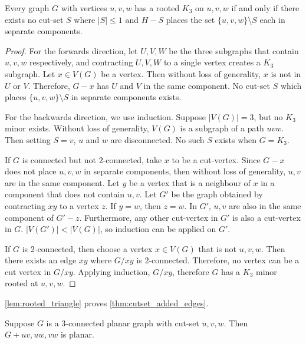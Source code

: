 \begin{lemma}\label{lem:rooted_triangle}
	Every graph $G$ with vertices $u, v, w$ has a rooted $K_3$ on $u, v, w$ if and only if there exists no cut-set $S$ where $|S| \leq 1$ and $H - S$ places the set $\{u,v,w\} \setminus S$ each in separate components. 
\end{lemma}
\begin{proof}
	For the forwards direction, let $U,V,W$ be the three subgraphs that contain $u, v, w$ respectively, and contracting $U, V, W$ to a single vertex creates a $K_3$ subgraph. Let $x \in V(G)$ be a vertex. Then without loss of generality, $x$ is not in $U$ or $V$. Therefore, $G - x$ has $U$ and $V$ in the same component. No cut-set $S$ which places $\{u,v,w\} \setminus S$ in separate components exists. 

	For the backwards direction, we use induction. Suppose $|V(G)| = 3$, but no $K_3$ minor exists. Without loss of generality, $V(G)$ is a subgraph of a path $uvw$. Then setting $S = v$, $u$ and $w$ are disconnected. No such $S$ exists when $G = K_3$. 

	If $G$ is connected but not $2$-connected, take $x$ to be a cut-vertex. Since $G - x$ does not place $u,v,w$ in separate components, then without loss of generality, $u,v$ are in the same component. Let $y$ be a vertex that is a neighbour of $x$ in a component that does not contain $u,v$. Let $G'$ be the graph obtained by contracting $xy$ to a vertex $z$. If $y = w$, then $z = w$. In $G'$, $u,v$ are also in the same component of $G' - z$. Furthermore, any other cut-vertex in $G'$ is also a cut-vertex in $G$. $|V(G')| < |V(G)|$, so induction can be applied on $G'$. 

	If $G$ is 2-connected, then choose a vertex $x \in V(G)$ that is not $u,v,w$. Then there exists an edge $xy$ where $G/xy$ is $2$-connected. Therefore, no vertex can be a cut vertex in $G/xy$. Applying induction, $G/xy$, therefore $G$ has a $K_3$ minor rooted at $u,v,w$.
\end{proof}


\cref{lem:rooted_triangle} proves \cref{thm:cutset_added_edges}. 

\begin{lemma}\label{thm:cutset_added_edges}
	Suppose $G$ is a $3$-connected planar graph with cut-set $u,v,w$. Then $G + uv, uw, vw$ is planar. 
\end{lemma}

